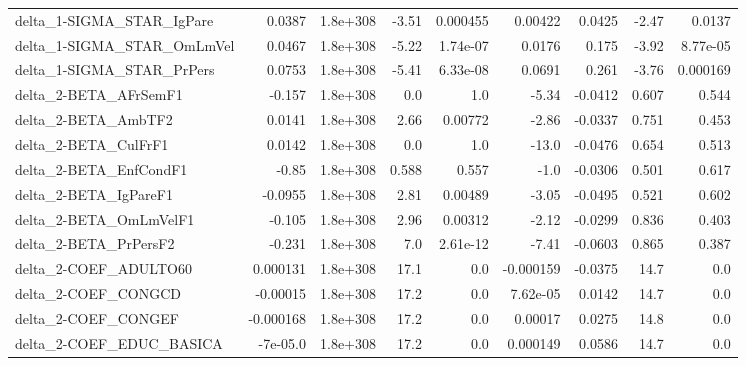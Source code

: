 \begin{tabular}{lrrrrrrrr}
delta\_1-SIGMA\_STAR\_IgPare             &      0.0387 &     1.8e+308 &   -3.51 & 0.000455 &    0.00422 &      0.0425 &        -2.47 &        0.0137 \\
delta\_1-SIGMA\_STAR\_OmLmVel            &      0.0467 &     1.8e+308 &   -5.22 & 1.74e-07 &     0.0176 &       0.175 &        -3.92 &      8.77e-05 \\
delta\_1-SIGMA\_STAR\_PrPers             &      0.0753 &     1.8e+308 &   -5.41 & 6.33e-08 &     0.0691 &       0.261 &        -3.76 &      0.000169 \\
delta\_2-BETA\_AFrSemF1                 &      -0.157 &     1.8e+308 &     0.0 &      1.0 &      -5.34 &     -0.0412 &        0.607 &         0.544 \\
delta\_2-BETA\_AmbTF2                   &      0.0141 &     1.8e+308 &    2.66 &  0.00772 &      -2.86 &     -0.0337 &        0.751 &         0.453 \\
delta\_2-BETA\_CulFrF1                  &      0.0142 &     1.8e+308 &     0.0 &      1.0 &      -13.0 &     -0.0476 &        0.654 &         0.513 \\
delta\_2-BETA\_EnfCondF1                &       -0.85 &     1.8e+308 &   0.588 &    0.557 &       -1.0 &     -0.0306 &        0.501 &         0.617 \\
delta\_2-BETA\_IgPareF1                 &     -0.0955 &     1.8e+308 &    2.81 &  0.00489 &      -3.05 &     -0.0495 &        0.521 &         0.602 \\
delta\_2-BETA\_OmLmVelF1                &      -0.105 &     1.8e+308 &    2.96 &  0.00312 &      -2.12 &     -0.0299 &        0.836 &         0.403 \\
delta\_2-BETA\_PrPersF2                 &      -0.231 &     1.8e+308 &     7.0 & 2.61e-12 &      -7.41 &     -0.0603 &        0.865 &         0.387 \\
delta\_2-COEF\_ADULTO60                 &    0.000131 &     1.8e+308 &    17.1 &      0.0 &  -0.000159 &     -0.0375 &         14.7 &           0.0 \\
delta\_2-COEF\_CONGCD                   &    -0.00015 &     1.8e+308 &    17.2 &      0.0 &   7.62e-05 &      0.0142 &         14.7 &           0.0 \\
delta\_2-COEF\_CONGEF                   &   -0.000168 &     1.8e+308 &    17.2 &      0.0 &    0.00017 &      0.0275 &         14.8 &           0.0 \\
delta\_2-COEF\_EDUC\_BASICA              &    -7e-05.0 &     1.8e+308 &    17.2 &      0.0 &   0.000149 &      0.0586 &         14.7 &           0.0 \\

\end{tabular}
